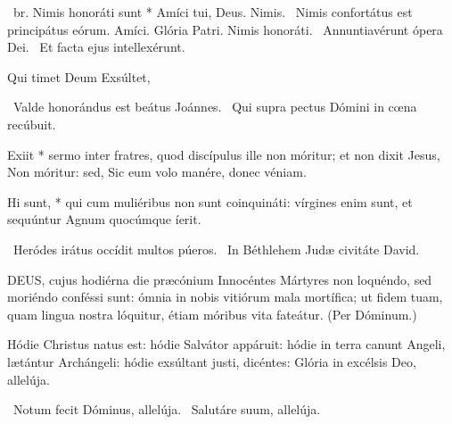 \R\ br. Nimis honoráti sunt * Amíci tui, Deus. Nimis. \V\ Nimis confortátus est principátus eórum. Amíci. Glória Patri. Nimis honoráti. \V\ Annuntiavérunt ópera Dei. \R\ Et facta ejus intellexérunt.



 Qui timet Deum  Exsúltet, 

\V\ Valde honorándus est beátus Joánnes. \R\ Qui supra pectus Dómini in cœna recúbuit.

 Exiit * sermo inter fratres, quod discípulus ille non móritur; et non dixit Jesus, Non móritur: sed, Sic eum volo manére, donec véniam.


\sectionornament






 Hi sunt, * qui cum muliéribus non sunt coinquináti: vírgines enim sunt, et sequúntur Agnum quocúmque íerit.

\V\ Heródes irátus occídit multos púeros. \R\ In Béthlehem Judæ civitáte David.


\lettrine[lines=2]{D}{EUS}, cujus hodiérna die præcónium Innocéntes Mártyres non loquéndo, sed moriéndo conféssi sunt: ómnia in nobis vitiórum mala mortífica; ut fidem tuam, quam lingua nostra lóquitur, étiam móribus vita fateátur. (Per Dóminum.)


 Hódie Christus natus est: hódie Salvátor appáruit: hódie in terra canunt Angeli, lætántur Archángeli: hódie exsúltant justi, dicéntes: Glória in excélsis Deo, allelúja.

\V\ Notum fecit Dóminus, allelúja. \R\ Salutáre suum, allelúja.


